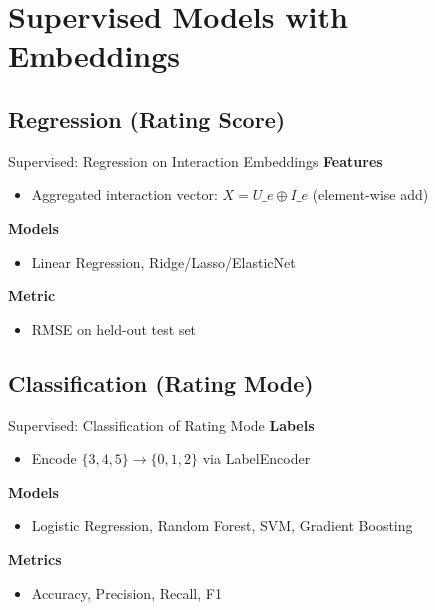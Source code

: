 \documentclass[aspectratio=169]{beamer}
\begin{document}
\section{Supervised Models with Embeddings}

\subsection{Regression (Rating Score)}
\begin{frame}{Supervised: Regression on Interaction Embeddings}
\textbf{Features}
\begin{itemize}
  \item Aggregated interaction vector: \(X = U\_e \oplus I\_e\) (element-wise add)
\end{itemize}
\textbf{Models}
\begin{itemize}
  \item Linear Regression, Ridge/Lasso/ElasticNet
\end{itemize}
\textbf{Metric}
\begin{itemize}
  \item RMSE on held-out test set
\end{itemize}

\end{frame}

\subsection{Classification (Rating Mode)}
\begin{frame}{Supervised: Classification of Rating Mode}
\textbf{Labels}
\begin{itemize}
  \item Encode \(\{3,4,5\} \rightarrow \{0,1,2\}\) via LabelEncoder
\end{itemize}
\textbf{Models}
\begin{itemize}
  \item Logistic Regression, Random Forest, SVM, Gradient Boosting
\end{itemize}
\textbf{Metrics}
\begin{itemize}
  \item Accuracy, Precision, Recall, F1
\end{itemize}

\end{frame}
\end{document}
